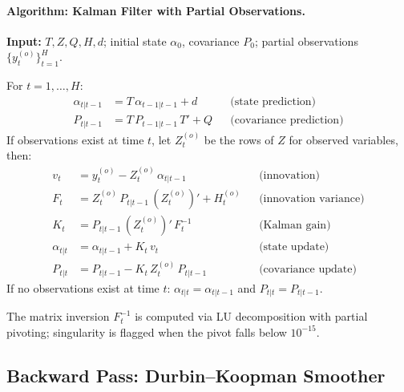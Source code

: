 \documentclass[11pt]{article}
\theoremstyle{definition}
\theoremstyle{remark}
\begin{document}
\paragraph{Algorithm: Kalman Filter with Partial Observations.}
\label{alg:kf}
\textbf{Input:} $T, Z, Q, H, d$; initial state $\alpha_0$,
covariance $P_0$; partial observations $\{y_t^{(o)}\}_{t=1}^{H}$.

\noindent For $t = 1, \ldots, H$:
\begin{align}
  \alpha_{t|t-1} &= T\, \alpha_{t-1|t-1} + d
    & &\text{(state prediction)} \label{eq:kf_pred_a} \\
  P_{t|t-1} &= T\, P_{t-1|t-1}\, T' + Q
    & &\text{(covariance prediction)} \label{eq:kf_pred_P}
\end{align}
If observations exist at time $t$, let $Z_t^{(o)}$ be the rows of $Z$
for observed variables, then:
\begin{align}
  v_t &= y_t^{(o)} - Z_t^{(o)}\, \alpha_{t|t-1}
    & &\text{(innovation)} \label{eq:kf_innov} \\
  F_t &= Z_t^{(o)}\, P_{t|t-1}\, (Z_t^{(o)})' + H_t^{(o)}
    & &\text{(innovation variance)} \label{eq:kf_F} \\
  K_t &= P_{t|t-1}\, (Z_t^{(o)})'\, F_t^{-1}
    & &\text{(Kalman gain)} \label{eq:kf_K} \\
  \alpha_{t|t} &= \alpha_{t|t-1} + K_t\, v_t
    & &\text{(state update)} \label{eq:kf_upd_a} \\
  P_{t|t} &= P_{t|t-1} - K_t\, Z_t^{(o)}\, P_{t|t-1}
    & &\text{(covariance update)} \label{eq:kf_upd_P}
\end{align}
If no observations exist at time $t$: $\alpha_{t|t} = \alpha_{t|t-1}$
and $P_{t|t} = P_{t|t-1}$.

The matrix inversion $F_t^{-1}$ is computed via LU decomposition with
partial pivoting; singularity is flagged when the pivot falls below
$10^{-15}$.

\subsection{Backward Pass: Durbin--Koopman Smoother}\label{sec:dk}
\end{document}
